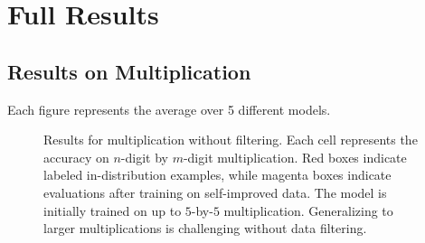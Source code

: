 
\newpage
\section{Full Results}\label{sec:full_results}







\subsection{Results on Multiplication}\label{sec:mult_full_results}

Each figure represents the average over 5 different models.


\begin{figure}[ht!]
    \centering
    \caption{Results for multiplication without filtering. Each cell represents the accuracy on $n$-digit by $m$-digit multiplication. Red boxes indicate labeled in-distribution examples, while magenta boxes indicate evaluations after training on self-improved data. The model is initially trained on up to $5$-by-$5$ multiplication. Generalizing to larger multiplications is challenging without data filtering.}
    \label{fig:multiplication_vanilla_full}
\end{figure}


